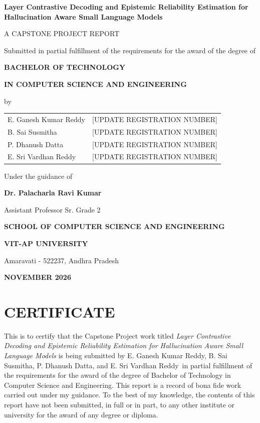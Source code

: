 \documentclass[12pt,a4paper,oneside]{report}
\newcommand{\projecttitle}{Layer Contrastive Decoding and Epistemic Reliability Estimation for Hallucination Aware Small Language Models}
\newcommand{\guide}{Dr. Palacharla Ravi Kumar}
\newcommand{\department}{Computer Science and Engineering}
\newcommand{\studentone}{E. Ganesh Kumar Reddy}
\newcommand{\studenttwo}{B. Sai Susmitha}
\newcommand{\studentthree}{P. Dhanush Datta}
\newcommand{\studentfour}{E. Sri Vardhan Reddy}
\begin{document}

\begin{titlepage}
\begin{center}
{\Large\bfseries \projecttitle\par}
\vspace{0.75in}
{\large A CAPSTONE PROJECT REPORT\par}
\vspace{0.35in}
{\normalsize Submitted in partial fulfillment of the requirements for the award of the degree of\par}
\vspace{0.25in}
{\large\bfseries BACHELOR OF TECHNOLOGY\par}
{\large\bfseries IN COMPUTER SCIENCE AND ENGINEERING\par}
\vspace{0.45in}
{\normalsize by\par}
\vspace{0.15in}
\begin{tabular}{ll}
\studentone & [UPDATE REGISTRATION NUMBER]\\
\studenttwo & [UPDATE REGISTRATION NUMBER]\\
\studentthree & [UPDATE REGISTRATION NUMBER]\\
\studentfour & [UPDATE REGISTRATION NUMBER]\\
\end{tabular}
\vfill
{\normalsize Under the guidance of\par}
\vspace{0.12in}
{\large\bfseries \guide\par}
{\normalsize Assistant Professor Sr. Grade 2\par}
\vspace{0.65in}
{\large\bfseries SCHOOL OF COMPUTER SCIENCE AND ENGINEERING\par}
{\large\bfseries VIT-AP UNIVERSITY\par}
{\normalsize Amaravati - 522237, Andhra Pradesh\par}
\vspace{0.35in}
{\bfseries NOVEMBER 2026\par}
\end{center}
\end{titlepage}

\chapter*{CERTIFICATE}
\thispagestyle{plain}
\noindent This is to certify that the Capstone Project work titled \emph{\projecttitle} is being submitted by \studentone, \studenttwo, \studentthree, and \studentfour\ in partial fulfillment of the requirements for the award of the degree of Bachelor of Technology in \department. This report is a record of bona fide work carried out under my guidance. To the best of my knowledge, the contents of this report have not been submitted, in full or in part, to any other institute or university for the award of any degree or diploma.
\end{document}

